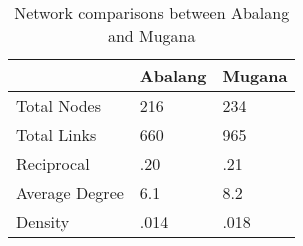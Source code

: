 \begin{table}[H]
\centering
\caption{Network comparisons between Abalang and Mugana}
\begin{tabular}{lll}
\hline
               & \textbf{Abalang} & \textbf{Mugana} \\ \hline
Total Nodes    & 216              & 234             \\
Total Links    & 660              & 965             \\
Reciprocal     & .20              & .21             \\
Average Degree & 6.1              & 8.2             \\
Density        & .014             & .018           \\ \hline 
\end{tabular}
\end{table}